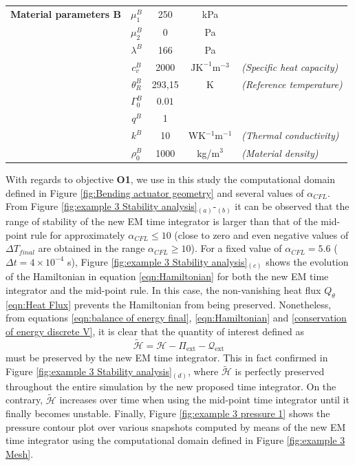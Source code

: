 \begin{table}[htbp]
\begin{tabular}{l | c c c l|}
		\cellcolor{gray!15}\textbf{Material parameters B} &   $\mu^B_1$ &  250  &  kPa &
		\\
		\cellcolor{gray!15}&   $\mu^B_2$ & 0 & Pa &\\ %
		\cellcolor{gray!15}&  $\lambda^B$ & 166 & Pa &\\
		\cellcolor{gray!15}&  $c^B_v$ & 2000 & $\text{J}\text{K}^{-1}\text{m}^{-3}$& \textit{(Specific heat capacity)}\\
		\cellcolor{gray!15}&  $\theta^B_R$ & 293,15 & K& \textit{(Reference temperature)}\\
		\cellcolor{gray!15}&  $\Gamma^B_0$ & $0.01$ & &\\
		\cellcolor{gray!15}&  $q^B$ & 1 & &\\
		\cellcolor{gray!15}&  $k^B$ & 10 & WK$^{-1}$m$^{-1}$& \textit{(Thermal conductivity)}\\	
		\cellcolor{gray!15}&  $\rho^B_0$ & 1000 & kg/$\text{m}^3$& \textit{(Material density)}\\						
	\end{tabular}
\end{table}


With regards to objective \textbf{O1}, we use in this study the computational domain defined in Figure \ref{fig:Bending actuator geometry} and several values of $\alpha_{CFL}$. From Figure \ref{fig:example 3 Stability analysis}$_{(a)}$-$_{(b)}$ it can be observed that the range of stability of the new EM time integrator is larger than that of the mid-point rule for approximately $\alpha_{CFL}\leq 10$ (close to zero and even negative values of $\Delta T_{final}$ are obtained in the range $\alpha_{CFL}\geq 10$). 
For a fixed value of $\alpha_{CFL}=5.6$ ($\Delta t =4\times 10^{-4}$ s), Figure \ref{fig:example 3 Stability analysis}$_{(c)}$ shows the evolution of the Hamiltonian in equation \eqref{eqn:Hamiltonian} for both the new EM time integrator and the mid-point rule. In this case, the non-vanishing heat flux $Q_{\theta}$ \eqref{eqn:Heat Flux} prevents the Hamiltonian from being preserved. Nonetheless, from equations \eqref{eqn:balance of energy final}, \eqref{eqn:Hamiltonian} and \eqref{conservation of energy discrete V}, it is clear that the quantity of interest defined as
%
\begin{equation}\label{eqn:tildeH}
\widetilde{\mathcal{H}}=\mathcal{H} - \Pi_{\text{ext}} - \mathcal{Q}_{\text{ext}} 
\end{equation}
%
must be preserved by the new EM time integrator. This in fact confirmed in Figure \ref{fig:example 3 Stability analysis}$_{(d)}$, where $\widetilde{\mathcal{H}}$ is perfectly preserved throughout the entire simulation by the new proposed time integrator. On the contrary, $\widetilde{\mathcal{H}}$ increases over time when using the mid-point time integrator until it finally becomes unstable. Finally, Figure \ref{fig:example 3 pressure 1}  shows the pressure contour plot over various snapshots computed by means of the new EM time integrator using the computational domain defined in Figure \ref{fig:example 3 Mesh}.





